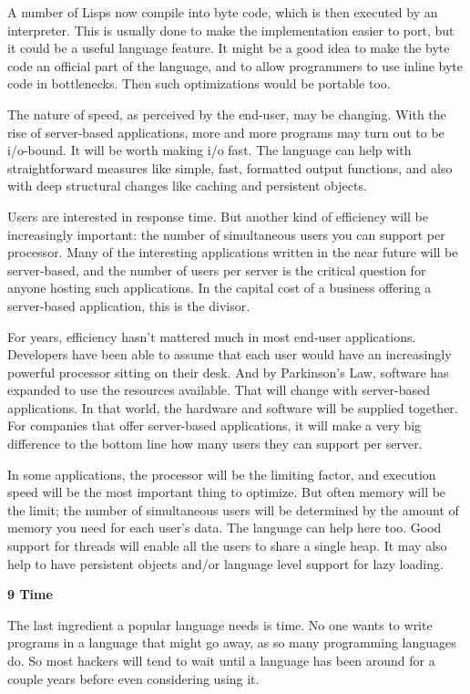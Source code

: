 A number of Lisps now compile into byte code, which is then executed by
an interpreter. This is usually done to make the implementation easier
to port, but it could be a useful language feature. It might be a good
idea to make the byte code an official part of the language, and to
allow programmers to use inline byte code in bottlenecks. Then such
optimizations would be portable too.

The nature of speed, as perceived by the end-user, may be changing. With
the rise of server-based applications, more and more programs may turn
out to be i/o-bound. It will be worth making i/o fast. The language can
help with straightforward measures like simple, fast, formatted output
functions, and also with deep structural changes like caching and
persistent objects.

Users are interested in response time. But another kind of efficiency
will be increasingly important: the number of simultaneous users you can
support per processor. Many of the interesting applications written in
the near future will be server-based, and the number of users per server
is the critical question for anyone hosting such applications. In the
capital cost of a business offering a server-based application, this is
the divisor.

For years, efficiency hasn't mattered much in most end-user
applications. Developers have been able to assume that each user would
have an increasingly powerful processor sitting on their desk. And by
Parkinson's Law, software has expanded to use the resources available.
That will change with server-based applications. In that world, the
hardware and software will be supplied together. For companies that
offer server-based applications, it will make a very big difference to
the bottom line how many users they can support per server.

In some applications, the processor will be the limiting factor, and
execution speed will be the most important thing to optimize. But often
memory will be the limit; the number of simultaneous users will be
determined by the amount of memory you need for each user's data. The
language can help here too. Good support for threads will enable all the
users to share a single heap. It may also help to have persistent
objects and/or language level support for lazy loading.

\textbf{9 Time}

The last ingredient a popular language needs is time. No one wants to
write programs in a language that might go away, as so many programming
languages do. So most hackers will tend to wait until a language has
been around for a couple years before even considering using it.

